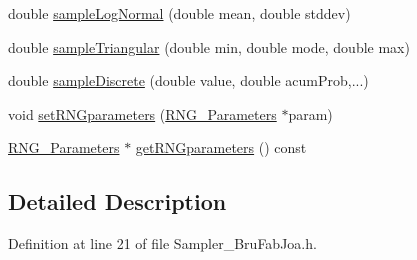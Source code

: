 \begin{DoxyCompactItemize}
double \hyperlink{class_sampler___bru_fab_joa_a7d67d644a3a8d2318f3efbe141209715}{sample\-Log\-Normal} (double mean, double stddev)
\item 
double \hyperlink{class_sampler___bru_fab_joa_adf431f34befb1c34c92bf3b8b771115a}{sample\-Triangular} (double min, double mode, double max)
\item 
double \hyperlink{class_sampler___bru_fab_joa_a92b6f623bf14640d6a6aa61d0ccf0061}{sample\-Discrete} (double value, double acum\-Prob,...)
\item 
void \hyperlink{class_sampler___bru_fab_joa_aa0c97683d644b30d76754621d14cd303}{set\-R\-N\-Gparameters} (\hyperlink{class_sampler__if_1_1_r_n_g___parameters}{R\-N\-G\-\_\-\-Parameters} $\ast$param)
\item 
\hyperlink{class_sampler__if_1_1_r_n_g___parameters}{R\-N\-G\-\_\-\-Parameters} $\ast$ \hyperlink{class_sampler___bru_fab_joa_ac0c836807825ae2b4e7de6fd07e6efa9}{get\-R\-N\-Gparameters} () const 
\end{DoxyCompactItemize}


\subsection{Detailed Description}


Definition at line 21 of file Sampler\-\_\-\-Bru\-Fab\-Joa.\-h.



